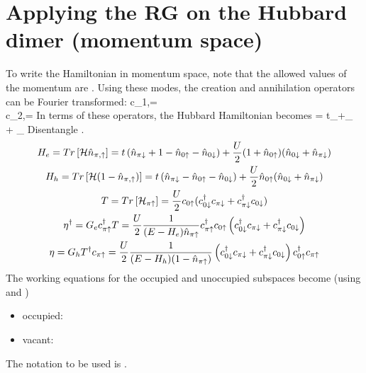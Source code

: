 \documentclass[12pt]{article}
\begin{document}
\section{Applying the RG on the Hubbard dimer (momentum space)}
To write the Hamiltonian in momentum space, note that the allowed values of the momentum are . Using these modes, the creation and annihilation operators can be Fourier transformed:
\beq
c_{1,\sigma}=\\
c_{2,\sigma}=
\eeq
In terms of these operators, the Hubbard Hamiltonian becomes
\beq
\ham = t\sum_\sigma{}+\prod_\sigma {} + \prod_\sigma {}
\eeq
Disentangle \il{\pi\ua}.
\begin{gather}
	H_e = Tr\left[{\mathcal{H} \hat n_{\pi,\uparrow}}\right] = t\left({\hat n_{\pi\downarrow}+1-\hat n_{0\uparrow}-\hat n_{0\downarrow}}\right)+\frac{U}{2}(1+\hat n_{0\uparrow})(\hat n_{0\downarrow}+\hat n_{\pi\downarrow})\\
	H_h = Tr\left[{\mathcal{H} (1-\hat n_{\pi,\uparrow})}\right] = t\left({\hat n_{\pi\downarrow}-\hat n_{0\uparrow}-\hat n_{0\downarrow}}\right)+\frac{U}{2}\hat n_{0\uparrow}(\hat n_{0\downarrow}+\hat n_{\pi\downarrow})\\
	T = Tr \left[{\mathcal{H}_{\pi\uparrow}}\right] = \frac{U}{2}c_{0\uparrow}(c^\dagger_{0\downarrow}c_{\pi\downarrow}+c^\dagger_{\pi\downarrow}c_{0\downarrow})\\
	\eta^\dagger = G_e c^\dagger_{\pi\uparrow}T= \frac{U}{2}\frac{1}{(E-H_e)\hat n_{\pi\uparrow}}c^\dagger_{\pi\uparrow}c_{0\uparrow}\left({c^\dagger_{0\downarrow}c_{\pi\downarrow}+c^\dagger_{\pi\downarrow}c_{0\downarrow}}\right)\\
	\eta= G_h T^\dagger c_{\pi\uparrow}= \frac{U}{2}\frac{1}{(E-H_h)(1-\hat n_{\pi\uparrow})}\left({c^\dagger_{0\downarrow}c_{\pi\downarrow}+c^\dagger_{\pi\downarrow}c_{0\downarrow}}\right)c^\dagger_{0\uparrow}c_{\pi\uparrow}\\
\end{gather}
The working equations for the occupied and unoccupied subspaces become (using  and )
\begin{itemize}
	\item occupied: 
	\item vacant: 
\end{itemize}
The notation to be used is .
\end{document}
